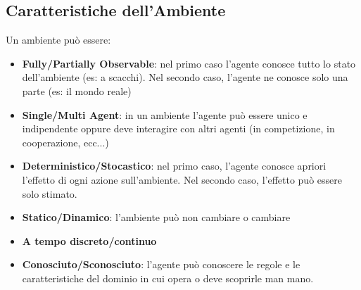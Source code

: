 \subsection{Caratteristiche dell'Ambiente}
Un ambiente può essere:
\begin{itemize}
    \item \textbf{Fully/Partially Observable}: nel primo caso l'agente conosce tutto lo stato dell'ambiente (es: a scacchi). Nel secondo caso, l'agente ne conosce solo una parte (es: il mondo reale)
    \item \textbf{Single/Multi Agent}: in un ambiente l'agente può essere unico e indipendente oppure deve interagire con altri agenti (in competizione, in cooperazione, ecc...)
    \item \textbf{Deterministico/Stocastico}: nel primo caso, l'agente conosce apriori l'effetto di ogni azione sull'ambiente. Nel secondo caso, l'effetto può essere solo stimato.
    \item \textbf{Statico/Dinamico}: l'ambiente può non cambiare o cambiare
    \item \textbf{A tempo discreto/continuo}
    \item \textbf{Conosciuto/Sconosciuto}: l'agente può conoscere le regole e le caratteristiche del dominio in cui opera o deve scoprirle man mano.
\end{itemize}

